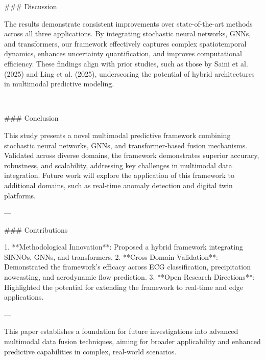 ### Discussion

The results demonstrate consistent improvements over state-of-the-art methods across all three applications. By integrating stochastic neural networks, GNNs, and transformers, our framework effectively captures complex spatiotemporal dynamics, enhances uncertainty quantification, and improves computational efficiency. These findings align with prior studies, such as those by Saini et al. (2025) and Ling et al. (2025), underscoring the potential of hybrid architectures in multimodal predictive modeling.

---

### Conclusion

This study presents a novel multimodal predictive framework combining stochastic neural networks, GNNs, and transformer-based fusion mechanisms. Validated across diverse domains, the framework demonstrates superior accuracy, robustness, and scalability, addressing key challenges in multimodal data integration. Future work will explore the application of this framework to additional domains, such as real-time anomaly detection and digital twin platforms.

---

### Contributions

1. **Methodological Innovation**: Proposed a hybrid framework integrating SINNOs, GNNs, and transformers.
2. **Cross-Domain Validation**: Demonstrated the framework's efficacy across ECG classification, precipitation nowcasting, and aerodynamic flow prediction.
3. **Open Research Directions**: Highlighted the potential for extending the framework to real-time and edge applications.

--- 

This paper establishes a foundation for future investigations into advanced multimodal data fusion techniques, aiming for broader applicability and enhanced predictive capabilities in complex, real-world scenarios.